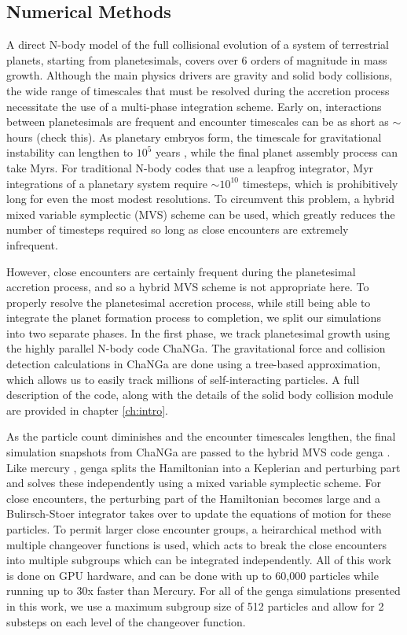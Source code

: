 \subsection{Numerical Methods} \label{sec:numerical}

A direct N-body model of the full collisional evolution of a system of terrestrial planets, starting from planetesimals, covers over 
6 orders of magnitude in mass growth. Although the main physics drivers are gravity and solid body collisions, the wide range of 
timescales that must be resolved during the accretion process necessitate the use of a multi-phase integration scheme. Early 
on, interactions between planetesimals are frequent and encounter timescales can be as short as $\sim$ hours (check this). 
As planetary embryos form, the timescale for gravitational instability can lengthen to $10^{5}$ years \cite{chambers96}, while 
the final planet assembly process can take Myrs. For traditional N-body codes that use a leapfrog integrator, Myr integrations 
of a planetary system require $\sim 10^{10}$ timesteps, which is prohibitively long for even the most modest resolutions. To 
circumvent this problem, a hybrid mixed variable symplectic (MVS) scheme \cite{chambers99} can be used, which greatly 
reduces the number of timesteps required so long as close encounters are extremely infrequent.

However, close encounters are certainly frequent during the planetesimal accretion process, and so a hybrid MVS scheme is 
not appropriate here. To properly resolve the planetesimal accretion process, while still being able to integrate the planet 
formation process to completion, we split our simulations into two separate phases. In the first phase, we track planetesimal 
growth using the highly parallel N-body code {\sc ChaNGa}. The gravitational force and collision detection calculations in {\sc ChaNGa} 
are done using a tree-based approximation, which allows us to easily track millions of self-interacting particles. A full description of the 
code, along with the details of the solid body collision module are provided in chapter \ref{ch:intro}.

As the particle count diminishes and the encounter timescales lengthen, the final simulation snapshots from {\sc ChaNGa} are 
passed to the hybrid MVS code {\sc genga} \cite{grimm14, grimm22}. Like {\sc mercury} \cite{chambers99}, {\sc genga} splits 
the Hamiltonian into a Keplerian and perturbing part and solves these independently using a mixed variable symplectic 
scheme. For close encounters, the perturbing part of the Hamiltonian becomes large and a Bulirsch-Stoer integrator takes over 
to update the equations of motion for these particles. To permit larger close encounter groups, a heirarchical method with 
multiple changeover functions is used, which acts to break the close encounters into multiple subgroups which can be 
integrated independently. All of this work is done on GPU hardware, and can be done with up to 60,000 particles while running 
up to 30x faster than {\sc Mercury}. For all of the {\sc genga} simulations presented in this work, we use a maximum subgroup 
size of 512 particles and allow for 2 substeps on each level of the changeover function.

